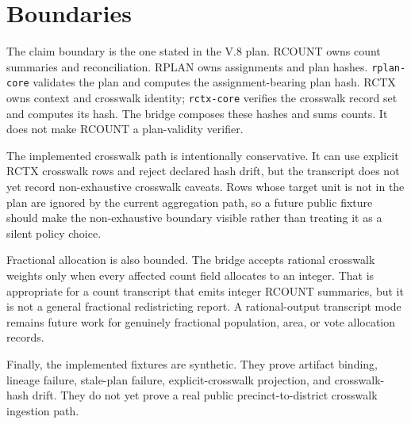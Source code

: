 \section{Boundaries}

The claim boundary is the one stated in the V.8 plan. RCOUNT owns count
summaries and reconciliation. RPLAN owns assignments and plan hashes.
\texttt{rplan-core} validates the plan and computes the assignment-bearing plan
hash. RCTX owns context and crosswalk identity; \texttt{rctx-core} verifies the
crosswalk record set and computes its hash. The bridge composes these hashes
and sums counts. It does not make RCOUNT a plan-validity verifier.

The implemented crosswalk path is intentionally conservative. It can use
explicit RCTX crosswalk rows and reject declared hash drift, but the transcript
does not yet record non-exhaustive crosswalk caveats. Rows whose target unit is
not in the plan are ignored by the current aggregation path, so a future public
fixture should make the non-exhaustive boundary visible rather than treating it
as a silent policy choice.

Fractional allocation is also bounded. The bridge accepts rational crosswalk
weights only when every affected count field allocates to an integer. That is
appropriate for a count transcript that emits integer RCOUNT summaries, but it
is not a general fractional redistricting report. A rational-output transcript
mode remains future work for genuinely fractional population, area, or vote
allocation records.

Finally, the implemented fixtures are synthetic. They prove artifact binding,
lineage failure, stale-plan failure, explicit-crosswalk projection, and
crosswalk-hash drift. They do not yet prove a real public precinct-to-district
crosswalk ingestion path.
